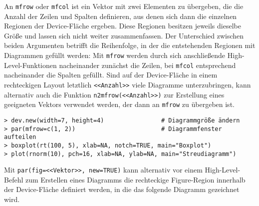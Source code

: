 An \lstinline!mfrow! oder \lstinline!mfcol! ist ein Vektor mit zwei Elementen zu übergeben, die die Anzahl der Zeilen und Spalten definieren, aus denen sich dann die einzelnen Regionen der Device-Fläche ergeben. Diese Regionen besitzen jeweils dieselbe Größe und lassen sich nicht weiter zusammenfassen. Der Unterschied zwischen beiden Argumenten betrifft die Reihenfolge, in der die entstehenden Regionen mit Diagrammen gefüllt werden: Mit \lstinline!mfrow! werden durch sich anschließende High-Level-Funktionen nacheinander zunächst die Zeilen, bei \lstinline!mfcol! entsprechend nacheinander die Spalten gefüllt. Sind auf der Device-Fläche in einem rechteckigen Layout letztlich \lstinline!<<Anzahl>>! viele Diagramme unterzubringen, kann alternativ auch die Funktion \lstinline!n2mfrow(<<Anzahl>>)! zur Erstellung eines geeigneten Vektors verwendet werden, der dann an \lstinline!mfrow! zu übergeben ist.
\begin{lstlisting}
> dev.new(width=7, height=4)                # Diagrammgröße ändern
> par(mfrow=c(1, 2))                        # Diagrammfenster aufteilen
> boxplot(rt(100, 5), xlab=NA, notch=TRUE, main="Boxplot")
> plot(rnorm(10), pch=16, xlab=NA, ylab=NA, main="Streudiagramm")
\end{lstlisting}

Mit \lstinline!par(fig=<<Vektor>>, new=TRUE)! kann alternativ vor einem High-Level-Befehl zum Erstellen eines Diagramms die rechteckige Figure-Region innerhalb der Device-Fläche definiert werden, in die das folgende Diagramm gezeichnet wird.

